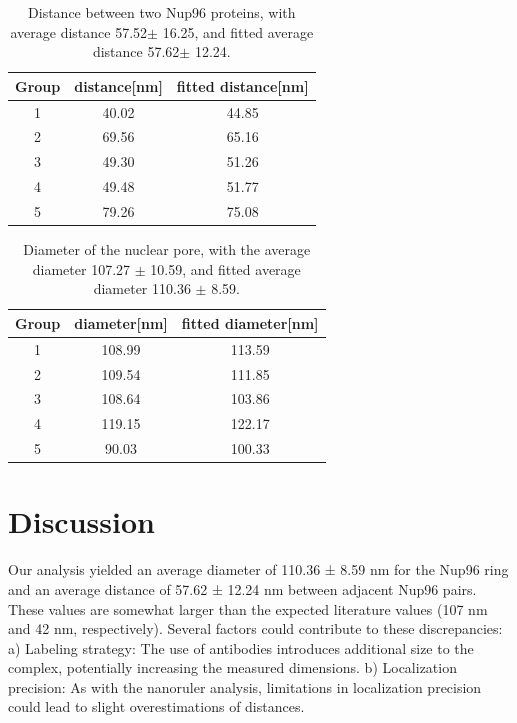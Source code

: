 \documentclass[a4paper,english,12pt,bibliography=totoc]{scrreprt}
\begin{document}
\begin{table}[hbpt]
    \centering
    \begin{tabular}{c|c|c}
    \hline
        Group & distance[nm]&fitted distance[nm] \\
    \hline
        1 &40.02 &44.85\\
        2 &69.56 &65.16\\
        3 &49.30 &51.26\\
        4 &49.48 &51.77\\
        5 &79.26 &75.08\\
    \hline
    \end{tabular}
    \caption{Distance between two Nup96 proteins, with average distance 57.52$\pm$ 16.25, and fitted average distance 57.62$\pm$ 12.24.}
    \label{tab:my_label}
\end{table}

\begin{table}[hbpt]
    \centering
    \begin{tabular}{c|c|c}
    \hline
        Group & diameter[nm]&fitted diameter[nm] \\
    \hline
        1 &108.99 &113.59\\
        2 &109.54 &111.85\\
        3 &108.64 &103.86\\
        4 &119.15 &122.17 \\
        5 &90.03 &100.33\\
        \hline
    \end{tabular}
    \caption{Diameter of the nuclear pore, with the average diameter 107.27 $\pm$ 10.59, and fitted average diameter 110.36 $\pm$ 8.59.}
    \label{tab:my_label}
\end{table}

\section{Discussion}

Our analysis yielded an average diameter of 110.36 ± 8.59 nm for the Nup96 ring and an average distance of 57.62 ± 12.24 nm between adjacent Nup96 pairs. These values are somewhat larger than the expected literature values (107 nm \cite{nuclear_pores} and 42 nm\cite{nuclear_pores}, respectively). Several factors could contribute to these discrepancies:
a) Labeling strategy: The use of antibodies introduces additional size to the complex, potentially increasing the measured dimensions.
b) Localization precision: As with the nanoruler analysis, limitations in localization precision could lead to slight overestimations of distances.\\
\end{document}
